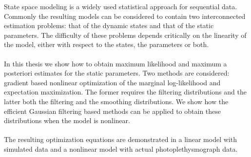 
\begin{abstractpage}[english]
State space modeling is a widely used statistical approach
for sequential data. Commonly the resulting models can be considered to contain
two interconnected estimation problems: that of the dynamic states
and that of the static parameters. The difficulty of these problems
depends critically on the linearity of the model, either with
respect to the states, the parameters or both.\\\\%
%
In this thesis we show how to obtain maximum likelihood and maximum a posteriori
estimates for the static parameters. Two methods are considered: gradient based nonlinear
optimization of the marginal log-likelihood and expectation maximization.
The former requires the filtering distributions and the latter both the
filtering and the smoothing distributions.
We show how the efficient Gaussian filtering based methods
can be applied to obtain these distributions when the model
is nonlinear.\\\\%
%
The resulting optimization equations are demonstrated in a linear model
with simulated data and a nonlinear model with actual photoplethysmograph
data. 

\end{abstractpage}

\newpage

